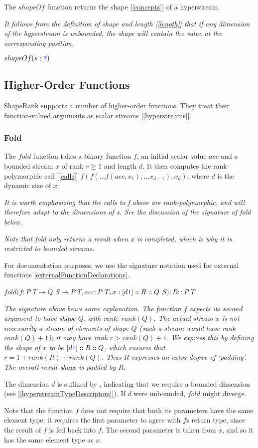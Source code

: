 \documentclass{article}
\begin{document}
The $shapeOf$ function returns the shape [\ref{concepts}] of a hyperstream.

{\em 
It follows from the  definition of shape and length [\ref{length}] that
if any  dimension of the hyperstream is unbounded, the shape will contain the value \QUESTIONMARK{} at the corresponding  position.
}

$shapeOf(s: \texttt{\color{blue} ?}{})$

\subsection{Higher-Order Functions}
\label{higherOrderFunctions}

ShapeRank supports a number of higher-order functions. They treat their function-valued arguments as scalar streams [\ref{hyperstreams}]. 


\subsubsection{Fold}
\label{fold}


The $fold$ function takes a binary function $f$, an initial scalar value $acc$ and a bounded stream $x$ of rank $r \ge 1$ and length $d$. It then computes the rank-polymorphic call [\ref{calls}]
$f(f( \ldots f(acc, x_1), \ldots x_{d-1}), x_d)$, where $d$ is the dynamic size of $x$.

{\em It is worth emphasizing that the calls to f above are rank-polymorphic, and will therefore adapt to the dimensions of x. See the discussion of the signature of fold below.
}

{\em Note that fold only returns a result when $x$ is completed, which is why it is restricted to bounded streams.}

For documentation purposes, we use the signature notation used for external functions \ref{externalFunctionDeclarations}.

$fold(f: P$ $T \to{}Q$ $S \to{}P$ $T, acc: P$ $T, x:[d\texttt{\color{blue} !}]::R::Q $ $S): R::P $ $T $

{\em
The signature above bears some explanation. The function $f$ expects its second argument to have shape $Q$, with rank: $rank(Q)$. The actual stream $x$ is not necessarily a stream of elements of shape $Q$ (such a stream would have rank $rank(Q) +1$); it may have rank $r \gt rank(Q) + 1$. We express this by defining the shape of $x$ to be $[d\texttt{\color{blue} !}]::R::Q$, which ensures that $r = 1 + rank(R) + rank(Q)$. Thus $R$ expresses an extra degree of `padding'. The overall result shape is padded by $R$.

The dimension $d$ is suffixed by \BANG{}, indicating that we require a bounded dimension (see [\ref{hyperstreamTypeDescriptors}]). If $d$ were unbounded, $fold$ might diverge.

Note that the function $f$ does not require that both its parameters have the same element type; it requires the first parameter to agree with $f$s return type, since the result of $f$ is fed back  into $f$. The second parameter is taken from $x$, and so it has the same element type as $x$. 
}
\end{document}
